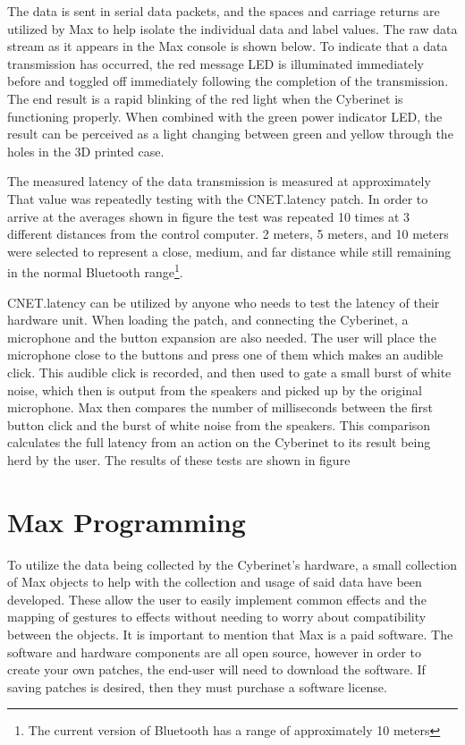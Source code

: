 The data is sent in serial data packets, and the spaces and carriage returns are utilized by Max to help isolate the individual data and label values. The raw data stream as it appears in the Max console is shown below. To indicate that a data transmission has occurred, the red message LED is illuminated immediately before and toggled off immediately following the completion of the transmission. The end result is a rapid blinking of the red light when the Cyberinet is functioning properly. When combined with the green power indicator LED, the result can be perceived as a light changing between green and yellow through the holes in the 3D printed case.


The measured latency of the data transmission is measured at approximately %
That value was repeatedly testing with the CNET.latency patch. In order to arrive at the averages shown in figure %
the test was repeated 10 times at 3 different distances from the control computer. 2 meters, 5 meters, and 10 meters were selected to represent a close, medium, and far distance while still remaining in the normal Bluetooth range\footnote{The current version of Bluetooth has a range of approximately 10 meters}.

CNET.latency can be utilized by anyone who needs to test the latency of their hardware unit. When loading the patch, and connecting the Cyberinet, a microphone and the button expansion are also needed. The user will place the microphone close to the buttons and press one of them which makes an audible click. This audible click is recorded, and then used to gate a small burst of white noise, which then is output from the speakers and picked up by the original microphone. Max then compares the number of milliseconds between the first button click and the burst of white noise from the speakers. This comparison calculates the full latency from an action on the Cyberinet to its result being herd by the user. The results of these tests are shown in figure  

\section{Max Programming}

To utilize the data being collected by the Cyberinet’s hardware, a small collection of Max objects to help with the collection and usage of said data have been developed. These allow the user to easily implement common effects and the mapping of gestures to effects without needing to worry about compatibility between the objects. It is important to mention that Max is a paid software. The software and hardware components are all open source, however in order to create your own patches, the end-user will need to download the software. If saving patches is desired, then they must purchase a software license. 

